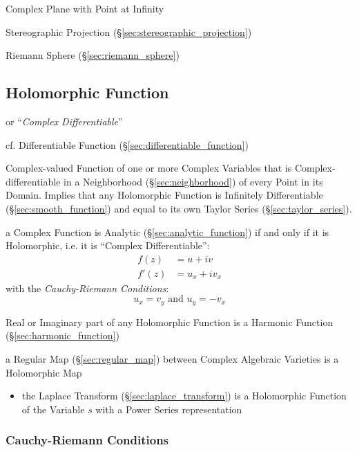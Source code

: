 Complex Plane with Point at Infinity

Stereographic Projection (\S\ref{sec:stereographic_projection})

Riemann Sphere (\S\ref{sec:riemann_sphere})



\subsection{Holomorphic Function}\label{sec:holomorphic_function}

or ``\emph{Complex Differentiable}''

cf. Differentiable Function (\S\ref{sec:differentiable_function})

Complex-valued Function of one or more Complex Variables that is
Complex-differentiable in a Neighborhood (\S\ref{sec:neighborhood}) of
every Point in its Domain. Implies that any Holomorphic Function is
Infinitely Differentiable (\S\ref{sec:smooth_function}) and equal to
its own Taylor Series (\S\ref{sec:taylor_series}).

a Complex Function is Analytic (\S\ref{sec:analytic_function}) if and only if
it is Holomorphic, i.e. it is ``Complex Differentiable'':
\begin{align*}
  f(z)  & = u + iv \\
  f'(z) & = u_x + iv_x
\end{align*}
with the \emph{Cauchy-Riemann Conditions}:
\[
  u_x = v_y \text{ and } u_y = - v_x
\]

Real or Imaginary part of any Holomorphic Function is a Harmonic
Function (\S\ref{sec:harmonic_function})

a Regular Map (\S\ref{sec:regular_map}) between Complex Algebraic Varieties is
a Holomorphic Map


\begin{itemize}
  \item the Laplace Transform (\S\ref{sec:laplace_transform}) is a Holomorphic
    Function of the Variable $s$ with a Power Series representation
\end{itemize}



\subsubsection{Cauchy-Riemann Conditions}\label{sec:cauchy_riemann}

